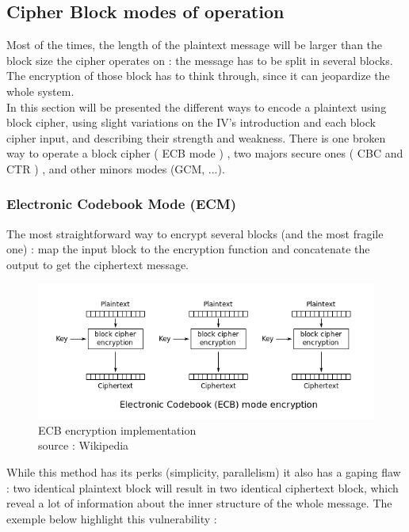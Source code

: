 \subsection{ Cipher Block modes of operation }

Most of the times, the length of the plaintext message will be larger than the block size the cipher operates on : the message has to be split in several blocks. The encryption of those block has to think through, since it can jeopardize the whole system. \\
In this section will be presented the different ways to encode a plaintext using block cipher, using slight variations on the IV's introduction and each block cipher input, and describing their strength and weakness. There is one broken way to operate a block cipher ( ECB mode ) , two majors secure ones ( CBC and CTR ) , and other minors modes (GCM, ...). \\

\subsubsection{ Electronic Codebook Mode (ECM) } 

The most straightforward way to encrypt several blocks (and the most fragile one) : map the input block to the encryption function and concatenate the output to get the ciphertext message. 


\begin{figure}[hb!]
    \centering
       \includegraphics[width=\textwidth]{images/ECB_encryption.png}
	\caption{ECB encryption implementation \\ source : Wikipedia}
	\label{fig:ECB_encryption_impl}
\end{figure}


While this method has its perks (simplicity, parallelism) it also has a gaping flaw : two identical plaintext block will result in two identical ciphertext block, which reveal a lot of information about the inner structure of the whole message. The exemple below highlight this vulnerability : 


